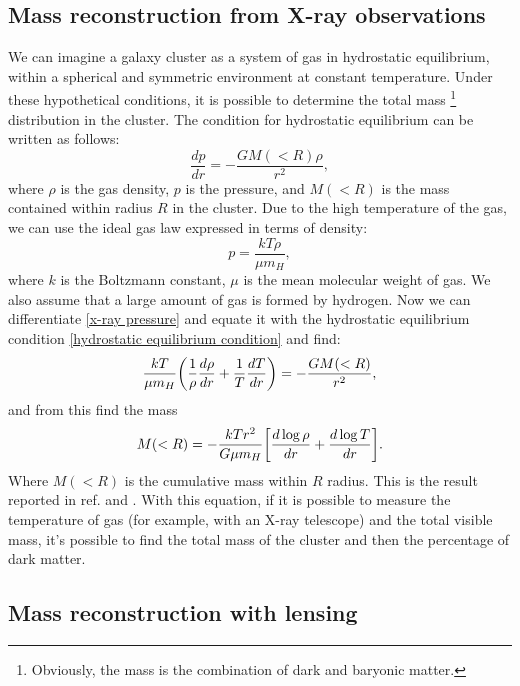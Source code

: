 \subsection{Mass reconstruction from X-ray observations}
We can imagine a galaxy cluster as a system of gas in hydrostatic equilibrium, within a spherical and symmetric environment at constant temperature.
Under these hypothetical conditions, it is possible to determine the total mass \footnote{Obviously, the mass is the combination of dark and baryonic matter.} distribution in the cluster.
The condition for hydrostatic equilibrium can be written as follows:
\begin{equation}\label{hydrostatic equilibrium condition}
\frac{dp}{dr} = -\frac{GM(<R) \rho}{r^2},
\end{equation}
where $\rho$ is the gas density, $p$ is the pressure, and $M(<R)$ is the mass contained within radius $R$ in the cluster.
Due to the high temperature of the gas, we can use the ideal gas law expressed in terms of density:
\begin{equation}\label{x-ray pressure}
    p = \frac{kT \rho}{\mu m_H},
\end{equation}
where $k$ is the Boltzmann constant, $\mu$ is the mean molecular weight of gas. We also assume that a large amount of gas is formed by hydrogen.
Now we can differentiate \eqref{x-ray pressure} and equate it with the hydrostatic equilibrium condition \eqref{hydrostatic equilibrium condition} and find:
\begin{equation}
    \frac{kT}{\mu m_H}\qty(\frac{1}{\rho} \frac{d\rho}{dr} + \frac{1}{T}\frac{dT}{dr}) = - \frac{GM(<R)}{r^2},
\end{equation}
and from this find the mass
\begin{equation}
    M(<R) = -\frac{kTr^2}{G \mu m_H} \qty[\frac{d\log\rho}{dr} + \frac{d\log T}{dr}].
\end{equation}
Where $M(<R)$ is the cumulative mass within $R$ radius. This is the result reported in ref. \cite{X-Ray_mass_determination_M87} and \cite{PhDPizzuti}. 
With this equation, if it is possible to measure the temperature of gas (for example, with an X-ray telescope) and the total visible mass, it's possible to find the total mass of the cluster and then the percentage of dark matter.

\subsection{Mass reconstruction with lensing}

